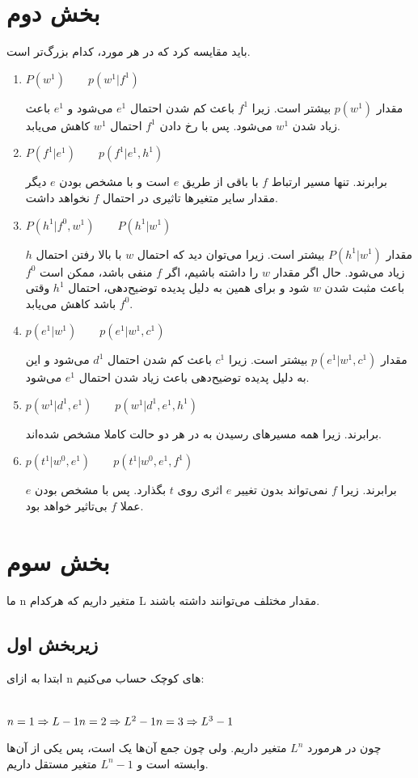 \section{بخش دوم}
باید مقایسه کرد که در هر مورد، کدام بزرگ‌تر است. 
\begin{enumerate}
	\item 
	$P(w^1) \qquad p(w^1 | f^1)$
	
	مقدار 
	$p(w^1)$
	بیشتر است. زیرا 
	$f^1$
	باعث کم شدن احتمال 
	$e^1$
	می‌شود و 
	$e^1$
	باعث زیاد شدن 
	$w^1$
	می‌شود. پس با رخ دادن 
	$f^1$ 
	احتمال 
	$w^1$
	کاهش می‌یابد. 
	
		\item 
	$P(f^1 | e^1) \qquad p(f^1 | e^1, h^1)$
	
	برابرند. تنها مسیر ارتباط 
	$f$
	با باقی از طریق $e$ است و با مشخص بودن 
	$e$
	دیگر مقدار سایر متغیرها تاثیری در احتمال 
	$f$ 
	نخواهد داشت. 
	\item 
	$P(h^1 | f^0, w^1) \qquad P(h^1 | w^1)$
	
	مقدار 
	$P(h^1 | w^1)$
	بیشتر است. زیرا می‌توان دید که احتمال 
	$w$
	با بالا رفتن احتمال 
	$h$
	زیاد می‌شود. حال اگر مقدار 
	$w$
	را داشته باشیم، اگر 
	$f$
	منفی باشد، ممکن است $f^0$ باعث مثبت شدن 
	$w$ 
	شود و برای همین به دلیل پدیده توضیح‌دهی، احتمال 
	$h^1$
	وقتی 
	$f^0$
	باشد کاهش می‌یابد.
	
	\item 
	$p(e^1 | w^1) \qquad p(e^1 | w^1, c^1)$
	
	مقدار $ p(e^1 | w^1, c^1)$ بیشتر است. زیرا 
	$c^1$
	باعث کم شدن احتمال 
	$d^1$
	می‌شود و این به دلیل پدیده توضیح‌دهی باعث زیاد شدن احتمال
	$e^1$
	می‌شود. 
	\item 
	$p(w^1 | d^1, e^1) \qquad p(w^1 | d^1, e^1, h^1)$
	
	برابرند. زیرا همه مسیرهای رسیدن به 
	در هر دو حالت کاملا مشخص شده‌اند. 
	
	\item 
	$p(t^1 | w^0, e^1) \qquad p(t^1 | w^0, e^1, f^1)$
	
	برابرند. زیرا 
	$f$
	نمی‌تواند بدون تغییر 
	$e$
	اثری روی 
	$t$
	بگذارد. پس با مشخص بودن 
	$e$
	عملا $f$ بی‌تاثیر خواهد بود.
	
\end{enumerate}

\section{بخش سوم}
ما n متغیر داریم که هرکدام L مقدار مختلف می‌توانند داشته باشند. 
\subsection{زیربخش اول}
ابتدا به ازای n های کوچک حساب می‌کنیم:
\begin{latin}
	~\\
	$
	n = 1 \Rightarrow L - 1 \\
	n = 2 \Rightarrow L^2 - 1 \\
	n = 3 \Rightarrow L^3 - 1 
	$
\end{latin}
چون در هرمورد 
$L^n$
متغیر داریم. ولی چون جمع آن‌ها یک است، پس یکی از آن‌ها وابسته است و 
$L^n - 1$
متغیر مستقل داریم. 


